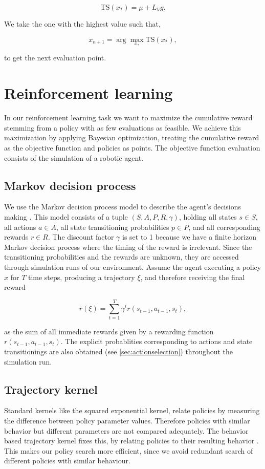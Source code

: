 $$\mathrm{TS}(x_*) = \mu + L_V g.$$

We take the one with the highest value such that,

$$x_{n+1} = \arg \max_{x_*} \mathrm{TS}(x_*),$$

to get the next evaluation point.

\section{Reinforcement learning}

In our reinforcement learning task we want to maximize the cumulative reward stemming from a policy with as few evaluations as feasible. We achieve this maximization by applying Bayesian optimization, treating the cumulative reward as the objective function and policies as points. The objective function evaluation consists of the simulation of a robotic agent.

\subsection{Markov decision process}
We use the Markov decision process model to describe the agent's decisions making \cite{sutton1998reinforcement}. This model consists of a tuple $(S,A,P,R,\gamma)$, holding all states $s \in S$, all actions $a \in A$, all state transitioning probabilities $p \in P$, and all corresponding rewards $r \in R$. The discount factor $\gamma$ is set to 1 because we have a finite horizon Markov decision process where the timing of the reward is irrelevant. Since the transitioning probabilities and the rewards are unknown, they are accessed through simulation runs of our environment. Assume the agent executing a policy $x$ for $T$ time steps, producing a trajectory $\xi$, and therefore receiving the final reward

$$\bar{r}(\xi)=\sum_{t=1}^T \gamma^t r(s_{t-1}, a_{t-1}, s_{t}),$$

as the sum of all immediate rewards given by a rewarding function $r(s_{t-1}, a_{t-1}, s_{t})$. The explicit probablities corresponding to actions and state transitionings are also obtained (see \ref{sec:actionselection}) throughout the simulation run.

\subsection{Trajectory kernel}\label{sec:trajKernel}
Standard kernels like the squared exponential kernel, relate policies by measuring the difference between policy parameter values. Therefore policies with similar behavior but different parameters are not compared adequately. The behavior based trajectory kernel fixes this, by relating policies to their resulting behavior \cite{wilson2014using}. This makes our policy search more efficient, since we avoid redundant search of different policies with similar behaviour.

